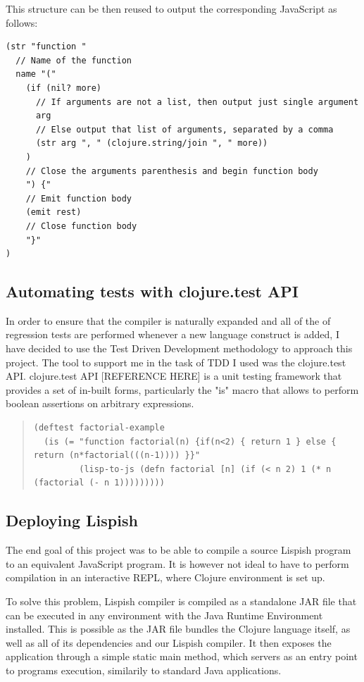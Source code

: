 This structure can be then reused to output the corresponding JavaScript as follows:

\begin{verbatim}
(str "function "
  // Name of the function 
  name "("
    (if (nil? more) 
      // If arguments are not a list, then output just single argument
      arg 
      // Else output that list of arguments, separated by a comma
      (str arg ", " (clojure.string/join ", " more))
    )
    // Close the arguments parenthesis and begin function body
    ") {"
    // Emit function body
    (emit rest)
    // Close function body
    "}"
)
\end{verbatim}

\subsection{Automating tests with clojure.test API}
In order to ensure that the compiler is naturally expanded and all of the of regression tests are performed whenever a new language construct is added, I have decided to use the Test Driven Development methodology to approach this project. 
The tool to support me in the task of TDD I used was the clojure.test API.
clojure.test API [REFERENCE HERE] is a unit testing framework that provides a set of in-built forms, particularly the "is" macro that allows to perform boolean assertions on arbitrary expressions. 

\begin{quote}
\begin{verbatim}
(deftest factorial-example
  (is (= "function factorial(n) {if(n<2) { return 1 } else { return (n*factorial(((n-1)))) }}"
         (lisp-to-js (defn factorial [n] (if (< n 2) 1 (* n (factorial (- n 1)))))))))
\end{verbatim}
\end{quote}

\subsection{Deploying Lispish}
The end goal of this project was to be able to compile a source Lispish program to an equivalent JavaScript program.
It is however not ideal to have to perform compilation in an interactive REPL, where Clojure environment is set up. 

To solve this problem, Lispish compiler is compiled as a standalone JAR file that can be executed in any environment with the Java Runtime Environment installed. This is possible as the JAR file bundles the Clojure language itself, as well as all of its dependencies and our Lispish compiler. It then exposes the application through a simple static main method, which servers as an entry point to programs execution, similarily to standard Java applications. 

